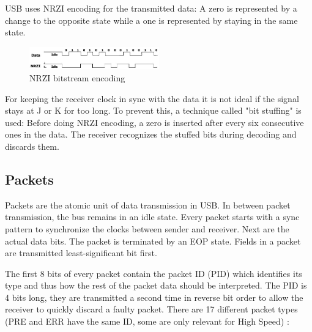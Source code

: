 \documentclass{article}
\begin{document}
USB uses NRZI encoding for the transmitted data: A zero is represented by a change to
the opposite state while a one is represented by staying in the same state.

\begin{figure}[!htbp]
  \caption{NRZI bitstream encoding \cite[p. 157]{usbstd}}
  \centering
  \includegraphics[width=0.5\textwidth]{images/nrzi_encoding.jpg}
\end{figure}

For keeping the receiver clock in sync with the data it is not ideal if the signal
stays at J or K for too long. To prevent this, a technique called "bit stuffing"
is used: Before doing NRZI encoding, a zero is inserted after every six consecutive ones
in the data. The receiver recognizes the stuffed bits during decoding and discards them.
\cite[p. 157]{usbstd}

\subsection {Packets}

Packets are the atomic unit of data transmission in USB. In between packet transmission,
the bus remains in an idle state. Every packet starts with a sync pattern to synchronize
the clocks between sender and receiver. Next are the actual data bits. The packet is
terminated by an EOP state. Fields in a packet are transmitted least-significant
bit first. \cite[p. 195]{usbstd}

The first 8 bits of every packet contain the packet ID (PID) which identifies its type
and thus how the rest of the packet data should be interpreted. The PID is 4 bits long, they are transmitted a second time in reverse bit order to allow the receiver to quickly
discard a faulty packet. There are 17 different packet types (PRE and ERR have the same ID,
some are only relevant for High Speed) \cite[p. 195]{usbstd}:
\end{document}
